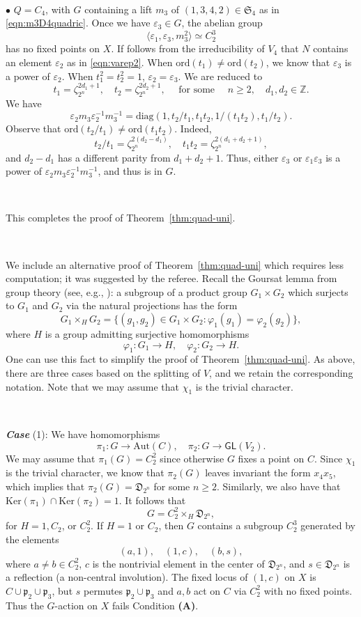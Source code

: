 \documentclass[12pt,reqno]{amsart}
\theoremstyle{plain}
\theoremstyle{remark}
\theoremstyle{definition}
\numberwithin{equation}{section}
\def\fD{{\mathfrak D}}
\def\fS{{\mathfrak S}}
\def\fS{{\mathfrak S}}
\def\bZ{{\mathbb Z}}
\def\Aut{\mathrm{Aut}}
\def\GL{\mathsf{GL}}
\def\Ker{\mathrm{Ker}}
\begin{document}
\ 


$\bullet$  $Q=C_4$, with $G$ containing a lift $m_3$ of $(1,3,4,2)\in\fS_4$ as in \eqref{eqn:m3D4quadric}. Once we have $\varepsilon_3\in G$, the abelian group 
$$
\langle\varepsilon_1,\varepsilon_3, m_3^2\rangle\simeq C_2^3
$$
has no fixed points on $X$. 
If follows from the irreducibility of $V_4$ that $N$ contains an element $\varepsilon_2$ as in \eqref{eqn:varep2}.
When $\mathrm{ord}(t_1)\neq \mathrm{ord}(t_2)$, we know that $\varepsilon_3$ is a power of $\varepsilon_2$. When $t_1^2=t_2^2=1$, $\varepsilon_2=\varepsilon_3$. We are reduced to $$
t_1=\zeta_{2^n}^{2d_1+1},  \quad t_2=\zeta_{2^n}^{2d_2+1}, \quad \text{  for some  } \quad n\geq2, \quad d_1,d_2\in \bZ.  
$$
We have
$$
\varepsilon_2m_3\varepsilon_2^{-1}m_3^{-1}=\mathrm{diag}(1,t_2/t_1,t_1t_2,1/(t_1t_2),t_1/t_2).
$$
Observe that $\mathrm{ord}(t_2/t_1)\neq \mathrm{ord}(t_1t_2)$. Indeed, 
$$
t_2/t_1=\zeta_{2^n}^{2(d_2-d_1)},\quad t_1t_2=\zeta_{2^n}^{2(d_1+d_2+1)},
$$
and $d_2-d_1$ has a different parity from $d_1+d_2+1.$ Thus, either $\varepsilon_3$ or $\varepsilon_1\varepsilon_3$ is a power of $\varepsilon_2m_3\varepsilon_2^{-1}m_3^{-1}$, 
and thus is in $G$. 

\ 

This completes the proof of Theorem~\ref{thm:quad-uni}. 

\ 

We include an alternative proof of Theorem~\ref{thm:quad-uni} which 
requires less computation; it was suggested by the referee.  Recall the Goursat lemma 
from group theory (see, e.g., \cite[Lemma 4.1]{DI}): a subgroup of a product group $G_1\times G_2$ which surjects to $G_1$ and $G_2$ via the natural projections has the form 
$$
G_1\times_HG_2=\{(g_1,g_2)\in G_1\times G_2: \varphi_1(g_1)=\varphi_2(g_2)\},
$$
where $H$ is a group admitting surjective homomorphisms 
$$
\varphi_1:G_1\to H, \quad \varphi_2:G_2\to H.
$$
One can use this fact to simplify the proof of Theorem~\ref{thm:quad-uni}. As above, there are three cases based on the splitting of $V$, and we retain the corresponding notation. Note that we may assume that $\chi_1$ is the trivial character. 

\ 

{\bf\em Case} (1): We have homomorphisms 
$$
\pi_1:G\to\Aut(C), \quad \pi_2:G\to \GL(V_2).
$$
We may assume that $\pi_1(G)=C_2^2$ since otherwise $G$ fixes a point on $C$. Since $\chi_1$ is the trivial character, we know that $\pi_2(G)$ leaves invariant the form $x_4x_5$, which implies that $\pi_2(G)=\fD_{2^{n}}$ for some $n\geq 2$. Similarly, we also have that $\Ker(\pi_1)\cap\Ker(\pi_2)=1$. It follows that 
$$
G=C_2^2\times_H\fD_{2^n},
$$ 
for $H=1,C_2$, or $C_2^2$. If $H=1$ or $C_2$, then $G$ contains a subgroup $C_2^3$ generated by the elements 
$$
(a,1),\quad (1,c), \quad(b,s),
$$
where $a\ne b\in C_2^2$, $c$ is the nontrivial element in the center of $\fD_{2^n}$, and $s\in\fD_{2^n}$ is a reflection (a non-central involution). The fixed locus of $(1,c)$ on $X$ is $C\cup\mathfrak p_2\cup\mathfrak p_3$, but $s$ permutes $\mathfrak p_2\cup\mathfrak p_3$ and $a,b$ act on $C$ via $C_2^2$ with no fixed points. Thus the $G$-action on $X$ fails Condition {\bf (A)}.
\end{document}
